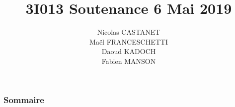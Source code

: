 \documentclass{beamer}
\title{3I013 Soutenance 6 Mai 2019}
\author{Nicolas CASTANET\\Maël FRANCESCHETTI\\Daoud KADOCH\\Fabien MANSON\\}
\begin{document}
	\begin{frame}
		\begin{center}
		\date{}
		\maketitle
		\end{center}
	\end{frame}
	
	
	\begin{frame}
		\section{}
		\begin{center}
		\frametitle{Sommaire}
		\tableofcontents{}
		\end{center}
	\end{frame}
	
	
\end{document}
